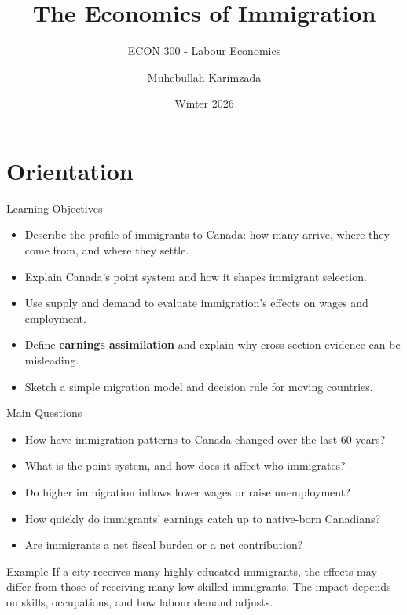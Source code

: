 \documentclass[aspectratio=169]{beamer}
\title{\textbf{The Economics of Immigration}}
\subtitle{{\large ECON 300 - Labour Economics}}
\author{Muhebullah Karimzada}
\date{Winter 2026}
\begin{document}
\begin{frame}[plain]
  \titlepage
\end{frame}

\section{Orientation}

\begin{frame}{Learning Objectives}
\transfade
\begin{itemize}
  \item Describe the profile of immigrants to Canada: how many arrive, where they come from, and where they settle.
  \item Explain Canada's point system and how it shapes immigrant selection.
  \item Use supply and demand to evaluate immigration's effects on wages and employment.
  \item Define \textbf{earnings assimilation} and explain why cross-section evidence can be misleading.
  \item Sketch a simple migration model and decision rule for moving countries.
\end{itemize}

\end{frame}

\begin{frame}{Main Questions}
\transfade
\begin{itemize}
  \item How have immigration patterns to Canada changed over the last 60 years?
  \item What is the point system, and how does it affect who immigrates?
  \item Do higher immigration inflows lower wages or raise unemployment?
  \item How quickly do immigrants' earnings catch up to native-born Canadians?
  \item Are immigrants a net fiscal burden or a net contribution?
\end{itemize}

\begin{exampleblock}{Example}
If a city receives many highly educated immigrants, the effects may differ from those of receiving many low-skilled immigrants. The impact depends on skills, occupations, and how labour demand adjusts.
\end{exampleblock}
\end{frame}
\end{document}

